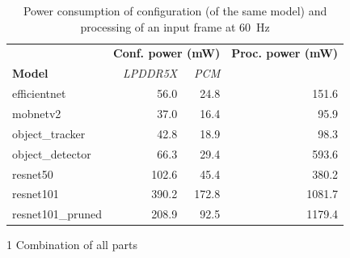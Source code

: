 \begin{table}[hbtp]
    \centering
    \begin{threeparttable}
        \begin{tabular}{@{}lrrr@{}}
            \toprule
                                       & \multicolumn{2}{l}{\textbf{Conf. power (mW)}} & \textbf{Proc. power (mW)} \\ \cmidrule(l){2-3} 
            \textbf{Model}             & \textit{LPDDR5X}  & \textit{PCM}    & \\ \midrule
            efficientnet               & 56.0              & 24.8            & 151.6 \\
            mobnetv2                   & 37.0              & 16.4            & 95.9 \\
            object\_tracker              & 42.8              & 18.9            & 98.3 \\
            object\_detector             & 66.3              & 29.4            & 593.6 \\
            resnet50                   & 102.6             & 45.4            & 380.2 \\
            resnet101\tnote{1}         & 390.2             & 172.8           & 1081.7 \\
            resnet101\_pruned\tnote{1} & 208.9             & 92.5            & 1179.4 \\ \bottomrule
        \end{tabular}
        \begin{tablenotes}
            \item[1] Combination of all parts
        \end{tablenotes}
    \end{threeparttable}
    \caption{Power consumption of configuration (of the same model) and processing of an input frame at \SI{60}{Hz}}
    \label{tab:example_models_power_consumption}
\end{table}
    